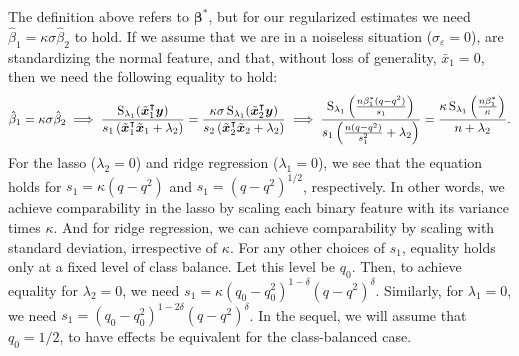 
The definition above refers to \(\bm{\beta}^*\), but for our regularized estimates we need
\(\hat{\beta}_1 = \kappa\sigma\hat{\beta}_2\) to hold. If we assume that we are in a
noiseless situation (\(\sigma_\varepsilon = 0\)), are standardizing the normal feature, and
that, without loss of generality, \(\bar{x}_1 = 0\), then we need the following equality to
hold:
%
\begin{equation}
  \label{eq:comparable-effects}
  \hat{\beta}_1 = \kappa\sigma \hat{\beta}_2 \implies \frac{\operatorname{S}_{\lambda_1}(\tilde{\bm{x}}_1^\intercal \bm{y})}{s_1\left(\tilde{\bm{x}}_1^\intercal \tilde{\bm{x}}_1 + \lambda_2\right)}  =\frac{\kappa\sigma \operatorname{S}_{\lambda_1}(\tilde{\bm{x}}_2^\intercal \bm{y})}{s_2\left(\tilde{\bm{x}}_2^\intercal \tilde{\bm{x}}_2 + \lambda_2\right)}  \implies \frac{\operatorname{S}_{\lambda_1}\left(\frac{n\beta_1^* (q - q^2)}{s_1}\right)}{s_1\left(\frac{n(q - q^2)}{s_1^2} + \lambda_2\right)} = \frac{\kappa \operatorname{S}_{\lambda_1}\left(\frac{n\beta_1^*}{\kappa} \right)}{n + \lambda_2}.
\end{equation}
For the lasso (\(\lambda_2 = 0\)) and ridge regression (\(\lambda_1=0\)), we see that the
equation holds for \(s_1 = \kappa (q - q^2)\) and \(s_1 = (q - q^2)^{1/2}\), respectively.
In other words, we achieve comparability in the lasso by scaling each binary feature with
its variance times \(\kappa\). And for ridge regression, we can achieve comparability by
scaling with standard deviation, irrespective of \(\kappa\). For any other choices of
\(s_1\), equality holds only at a fixed level of class balance. Let this level be \(q_0\).
Then, to achieve equality for \(\lambda_2 = 0\), we need \(s_1 =\kappa (q_0 - q_0^2)^{1 -
  \delta}(q - q^2)^\delta\). Similarly, for \(\lambda_1 = 0\), we need \(s_1 = (q_0 -
q_0^2)^{1 - 2\delta} (q - q^2)^\delta\). In the sequel, we will assume that \(q_0 = 1/2\),
to have effects be equivalent for the class-balanced case.

